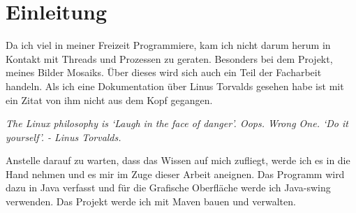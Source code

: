 \section{Einleitung}
Da ich viel in meiner Freizeit Programmiere, kam ich nicht darum herum in Kontakt mit Threads und Prozessen zu geraten. Besonders bei dem Projekt, meines Bilder Mosaiks. Über dieses wird sich auch ein Teil der Facharbeit handeln. Als ich eine Dokumentation über Linus Torvalds gesehen habe ist mit ein Zitat von ihm nicht aus dem Kopf gegangen.\\
\begin{center}
    \textit{The Linux philosophy is ‘Laugh in the face of danger’. Oops. Wrong One. ‘Do it yourself’. - Linus Torvalds.}
\end{center}
Anstelle darauf zu warten, dass das Wissen auf mich zufliegt, werde ich es in die Hand nehmen und es mir im Zuge dieser Arbeit aneignen. Das Programm wird dazu in Java verfasst und für die Grafische Oberfläche werde ich Java-swing verwenden. Das Projekt werde ich mit Maven bauen und verwalten.